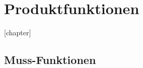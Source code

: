 \chapter{Produktfunktionen}
\label{ch:funktionen}

[chapter]
\setcounter{fanr}{10}
\newcommand{\fano}[1]{\subsection{#1}\addtocounter{fanr}{10}}
\newcommand{\subfano}[1]{\subsubsection{#1}\addtocounter{fanr}{1}}
\renewcommand\thesubsection{/FA\ifnum\value{fanr}<10 000\else\ifnum\value{fanr}<100 00\else\ifnum\value{fanr}<1000 0\fi\fi\fi\arabic{fanr}/}
\renewcommand\thesubsubsection{/FA\ifnum\value{fanr}<10 000\else\ifnum\value{fanr}<100 00\else\ifnum\value{fanr}<1000 0\fi\fi\fi\arabic{fanr}/}

\section{Muss-Funktionen} %

